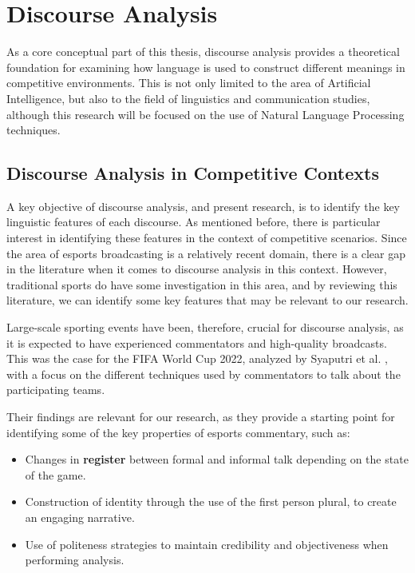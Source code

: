 \section{Discourse Analysis}
\label{sec:discourse-analysis}

As a core conceptual part of this thesis, discourse analysis provides a theoretical foundation for examining how language is used to construct different meanings in competitive environments. This is not only limited to the area of Artificial Intelligence, but also to the field of linguistics and communication studies, although this research will be focused on the use of Natural Language Processing techniques.

\subsection{Discourse Analysis in Competitive Contexts}

A key objective of discourse analysis, and present research, is to identify the key linguistic features of each discourse. As mentioned before, there is particular interest in identifying these features in the context of competitive scenarios. Since the area of esports broadcasting is a relatively recent domain, there is a clear gap in the literature when it comes to discourse analysis in this context. However, traditional sports do have some investigation in this area, and by reviewing this literature, we can identify some key features that may be relevant to our research.

\medskip

Large-scale sporting events have been, therefore, crucial for discourse analysis, as it is expected to have experienced commentators and high-quality broadcasts. This was the case for the FIFA World Cup 2022, analyzed by Syaputri et al. \cite{syaputri2024charla}, with a focus on the different techniques used by commentators to talk about the participating teams. 

\medskip

Their findings are relevant for our research, as they provide a starting point for identifying some of the key properties of esports commentary, such as:

\begin{itemize}
  \item Changes in \textbf{register} between formal and informal talk depending on the state of the game. 
  \item Construction of identity through the use of the first person plural, to create an engaging narrative.
  \item Use of politeness strategies to maintain credibility and objectiveness when performing analysis.
\end{itemize}

